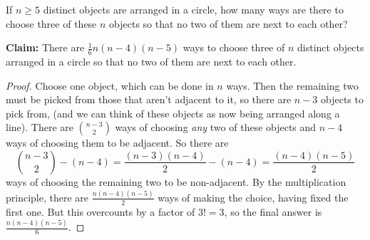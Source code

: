 \documentclass[11pt,dvipsnames]{book}
\numberwithin{equation}{section} %
\numberwithin{figure}{section} %
\numberwithin{table}{section} %
\begin{document}
\begin{exercise} If $n\geq 5$ distinct objects are arranged in a circle, how many ways are there to choose three of these $n$ objects so that no two of them are next to each other?

\begin{solution}
{\bf Claim:} 
There are $\frac{1}{6}n(n-4)(n-5)$ ways to choose three of $n$ distinct objects arranged in a circle so that no two of them are next to each other.


\begin{proof}
Choose one object, which can be done in $n$ ways. Then the remaining two must be picked from those that aren't adjacent to it, so there are $n-3$ objects to pick from, (and we can think of these objects as now being arranged along a line). There are ${{n-3} \choose 2}$ ways of choosing {\em any} two of these objects and
$n-4$ ways of choosing them to be adjacent. So there are
$${{n-3} \choose 2} - (n-4) = \frac{(n-3)(n-4)}{2} - (n-4) = \frac{(n-4)(n-5)}{2}$$
ways of choosing the remaining two to be non-adjacent. By the multiplication principle, there are $\frac{n(n-4)(n-5)}{2}$ ways of making the choice, having fixed the first one. But this overcounts by a factor of $3! = 3$, so the final answer is $\frac{n(n-4)(n-5)}{6}$. 
\end{proof}

\end{solution}
\end{exercise}


%
%
%
\end{document}
